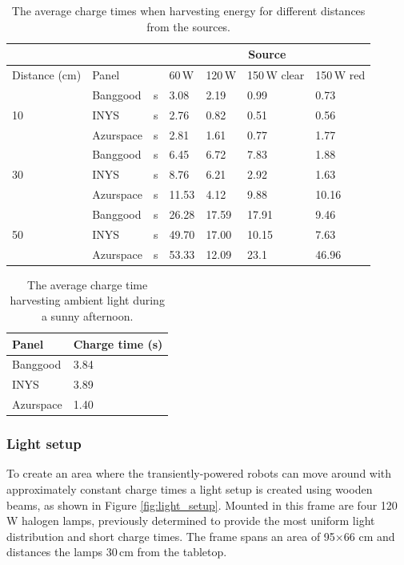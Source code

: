 \begin{table}[t]
	\centering
	\caption{The average charge times when harvesting energy for different distances from the sources.}
	\label{tab:light_results}
	\begin{tabular}{|l|l|l||l|l|l|l|}
		\hline
		\multicolumn{3}{|c|}{} & \multicolumn{4}{|c|}{Source} \\
		\hline
		Distance (cm) & Panel & & 60\,W & 120\,W & 150\,W clear & 150\,W red \\
		\hline \hline
		\multirow{3}{*}{10} & Banggood& s & 3.08 & 2.19 & 0.99 & 0.73 \\
		& INYS & s & 2.76 & 0.82 & 0.51 & 0.56 \\
		& Azurspace & s & 2.81 & 1.61 & 0.77 & 1.77 \\
		\hline
		\multirow{3}{*}{30} & Banggood & s & 6.45 & 6.72 & 7.83 & 1.88 \\
		& INYS & s & 8.76 & 6.21 & 2.92 & 1.63 \\
		& Azurspace & s & 11.53 & 4.12 & 9.88 & 10.16\\
		\hline
		\multirow{3}{*}{50} & Banggood & s & 26.28 & 17.59 & 17.91 & 9.46 \\
		& INYS & s & 49.70 & 17.00 & 10.15 & 7.63 \\
		& Azurspace & s & 53.33 & 12.09 & 23.1 & 46.96 \\
		\hline
	\end{tabular}
\end{table}

\begin{table}[t]
	\centering
	\caption{The average charge time harvesting ambient light during a sunny afternoon.}
	\label{tab:solar_results}
	\begin{tabular}{|l|l|}
		\hline
		Panel & Charge time (s) \\
		\hline \hline
		Banggood & 3.84\\
		INYS & 3.89\\ 
		Azurspace & 1.40\\
		\hline
	\end{tabular}
\end{table}

\subsubsection{Light setup}

To create an area where the transiently-powered robots can move around with approximately constant charge times a light setup is created using wooden beams, as shown in Figure \ref{fig:light_setup}.
Mounted in this frame are four 120\,W halogen lamps, previously determined to provide the most uniform light distribution and short charge times.
The frame spans an area of 95$\times$66 cm and distances the lamps 30\,cm from the tabletop.

